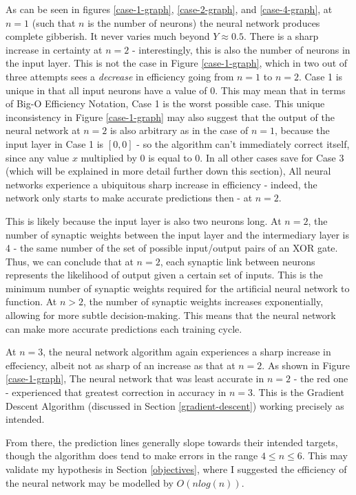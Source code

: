 \documentclass[12pt]{article}
\begin{document}
As can be seen in figures \ref{case-1-graph}, \ref{case-2-graph}, and \ref{case-4-graph}, at $n = 1$ (such that $n$ is the number of neurons) the neural network produces complete gibberish. It never varies much beyond $Y \approx 0.5$. There is a sharp increase in certainty at $n = 2$ - interestingly, this is also the number of neurons in the input layer. This is not the case in Figure \ref{case-1-graph}, which in two out of three attempts sees a \textit{decrease} in efficiency going from $n = 1$ to $n = 2$. Case 1 is unique in that all input neurons have a value of 0. This may mean that in terms of Big-O Efficiency Notation, Case 1 is the worst possible case. This unique inconsistency in Figure \ref{case-1-graph} may also suggest that the output of the neural network at $n = 2$ is also arbitrary as in the case of $n = 1$, because the input layer in Case 1 is $[0, 0]$ - so the algorithm can't immediately correct itself, since any value $x$ multiplied by $0$ is equal to 0. In all other cases save for Case 3 (which will be explained in more detail further down this section), All neural networks experience a ubiquitous sharp increase in efficiency - indeed, the network only starts to make accurate predictions then - at $n = 2$.

This is likely because the input layer is also two neurons long. At $n = 2$, the number of synaptic weights between the input layer and the intermediary layer is 4 - the same number of the set of possible input/output pairs of an XOR gate. Thus, we can conclude that at $n = 2$, each synaptic link between neurons represents the likelihood of output given a certain set of inputs. This is the minimum number of synaptic weights required for the artificial neural network to function. At $n > 2$, the number of synaptic weights increases exponentially, allowing for more subtle decision-making. This means that the neural network can make more accurate predictions each training cycle.

At $n = 3$, the neural network algorithm again experiences a sharp increase in effeciency, albeit not as sharp of an increase as that at $n = 2$. As shown in Figure \ref{case-1-graph}, The neural network that was least accurate in $n = 2$ - the red one - experienced that greatest correction in accuracy in $n = 3$. This is the Gradient Descent Algorithm (discussed in Section \ref{gradient-descent}) working precisely as intended.

From there, the prediction lines generally slope towards their intended targets, though the algorithm does tend to make errors in the range $4 \leq n \leq 6$. This may validate my hypothesis in Section \ref{objectives}, where I suggested the efficiency of the neural network may be modelled by $O(n log(n))$.
\end{document}
